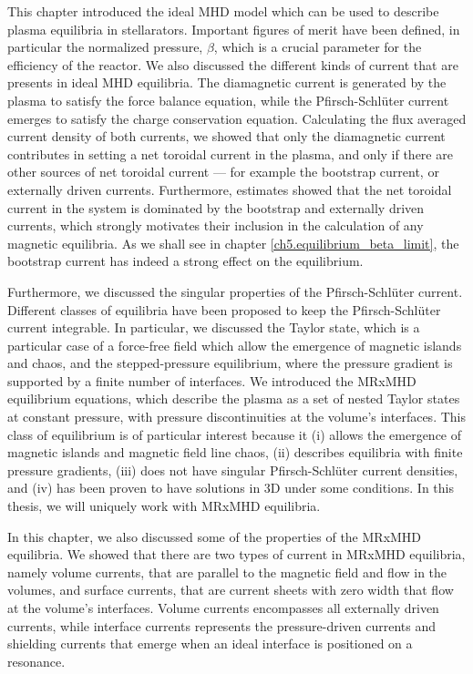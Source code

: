 \documentclass[my_thesis.tex]{subfiles}
\begin{document}
This chapter introduced the ideal MHD model which can be used to describe plasma equilibria in stellarators. Important figures of merit have been defined, in particular the normalized pressure, $\beta$, which is a crucial parameter for the efficiency of the reactor. We also discussed the different kinds of current that are presents in ideal MHD equilibria. The diamagnetic current is generated by the plasma to satisfy the force balance equation, while the Pfirsch-Schl\"uter current emerges to satisfy the charge conservation equation. Calculating the flux averaged current density of both currents, we showed that only the diamagnetic current contributes in setting a net toroidal current in the plasma, and only if there are other sources of net toroidal current --- for example the bootstrap current, or externally driven currents. Furthermore, estimates showed that the net toroidal current in the system is dominated by the bootstrap and externally driven currents, which strongly motivates their inclusion in the calculation of any magnetic equilibria. As we shall see in chapter \ref{ch5.equilibrium_beta_limit}, the bootstrap current has indeed a strong effect on the equilibrium.

Furthermore, we discussed the singular properties of the Pfirsch-Schl\"uter current. Different classes of equilibria have been proposed to keep the Pfirsch-Schl\"uter current integrable. In particular, we discussed the Taylor state, which is a particular case of a force-free field which allow the emergence of magnetic islands and chaos, and the stepped-pressure equilibrium, where the pressure gradient is supported by a finite number of interfaces. We introduced the MRxMHD equilibrium equations, which describe the plasma as a set of nested Taylor states at constant pressure, with pressure discontinuities at the volume's interfaces. This class of equilibrium is of particular interest because it (i) allows the emergence of magnetic islands and magnetic field line chaos, (ii) describes equilibria with finite pressure gradients, (iii) does not have singular Pfirsch-Schl\"uter current densities, and (iv) has been proven to have solutions in 3D under some conditions. In this thesis, we will uniquely work with MRxMHD equilibria. 

In this chapter, we also discussed some of the properties of the MRxMHD equilibria. We showed that there are two types of current in MRxMHD equilibria, namely volume currents, that are parallel to the magnetic field and flow in the volumes, and surface currents, that are current sheets with zero width that flow at the volume's interfaces. Volume currents encompasses all externally driven currents, while interface currents represents the pressure-driven currents and shielding currents that emerge when an ideal interface is positioned on a resonance.
\end{document}
